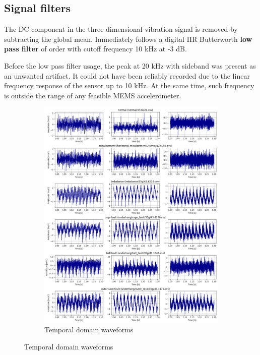 \subsection{Signal filters}
The DC component in the three-dimensional vibration signal is removed by subtracting the global mean. Immediately follows a digital IIR Butterworth \textbf{ low pass filter} of  order with cutoff frequency 10 kHz at -3 dB. 

Before the low pass filter usage, the peak at 20 kHz with sideband was present as an unwanted artifact. It could not have been reliably recorded due to the linear frequency response of the sensor up to 10 kHz. At the same time, such frequency is outside the range of any feasible MEMS accelerometer.

\begin{figure}[ht]
    \centering
    \begin{subfigure}[b]{0.44\textwidth}
        \includegraphics[width=\textwidth]{assets/design/Mafaulda-A-time-waveform.png}
        \caption{Temporal domain waveforms}
        \label{fig:design:fault-temporal-waveform}

\end{subfigure}
\end{figure}
